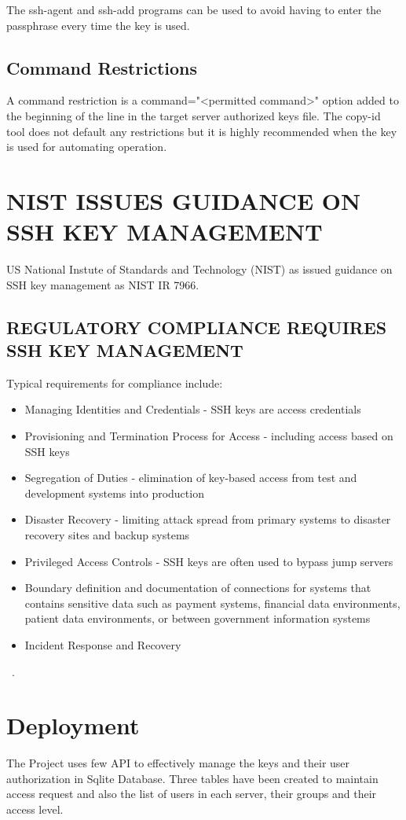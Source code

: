 The ssh-agent and ssh-add programs can be used to avoid having to 
enter the passphrase every time the key is used.

\subsection{Command Restrictions}
A command restriction is a command="<permitted command>" option added
to the beginning of the line in the target server authorized keys file.
The copy-id tool does not default any restrictions but it is highly 
recommended when the key is used for automating operation.

\section{NIST ISSUES GUIDANCE ON SSH KEY MANAGEMENT}
US National Instute of Standards and Technology (NIST) as issued guidance on
SSH key management as NIST IR 7966. 

\subsection{REGULATORY COMPLIANCE REQUIRES SSH KEY MANAGEMENT}
Typical requirements for compliance include:
\begin{itemize}
	\item Managing Identities and Credentials - SSH keys 
	are access credentials
	\item Provisioning and Termination Process for Access 
    - including access based on SSH keys
	\item Segregation of Duties - elimination of 
	key-based access from test and development systems into
	production
    \item Disaster Recovery - limiting attack spread
    from primary systems to disaster recovery sites and
    backup systems
    \item Privileged Access Controls - SSH keys are often used to 
    bypass jump servers
    \item Boundary definition and documentation of connections for 
    systems that contains sensitive data such as payment systems,
    financial data environments, patient data 
    environments, or between government information systems
    \item Incident Response and Recovery
\end{itemize}
~\cite{hid-sp18-513-sshkey}.

\section{Deployment}
The Project uses few API to effectively manage the keys and their
user authorization in Sqlite Database.
Three tables have been created to maintain access request and also
the list of users in each server, their groups and their access level.

